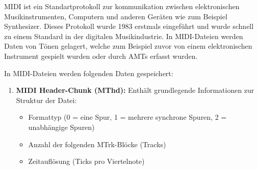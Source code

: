 MIDI ist ein Standartprotokoll zur kommunikation zwischen
elektronischen Musikinstrumenten, Computern und anderen Geräten wie zum Beispiel Synthesizer.
Dieses Protokoll wurde 1983 erstmals eingeführt und wurde schnell zu einem Standard in der digitalen Musikindustrie.
\cite{smith1983midi}
In MIDI-Dateien werden Daten von Tönen gelagert,
welche zum Beispiel zuvor von einem elektronischen Instrument gespielt wurden oder durch AMTs erfasst wurden.

In MIDI-Dateien werden folgenden Daten gespeichert:
\begin{enumerate}
    \item \textbf{MIDI Header-Chunk (MThd):} Enthält grundlegende Informationen zur Struktur der Datei:
    \begin{itemize}
        \item Formattyp (0 = eine Spur, 1 = mehrere synchrone Spuren, 2 = unabhängige Spuren)
        \item Anzahl der folgenden MTrk-Blöcke (Tracks)
        \item Zeitauflösung (Ticks pro Viertelnote)
    \end{itemize}


\end{enumerate}
